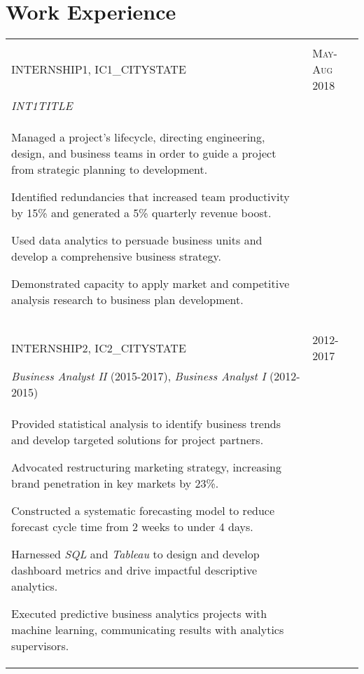 \documentclass[a4paper,10pt]{article}
\begin{document}
\section{Work Experience}
\begin{supertabular}{p{13.9cm}>{\raggedleft\arraybackslash}p{3.4cm}}

   \\

	\textsc{INTERNSHIP1}, IC1_CITYSTATE
	& \textsc{May-Aug 2018} \\
	\small	\emph{INT1TITLE} & \\
	\begin{enumerate*}[label =$\circ$, itemjoin={\newline}]
		\item \footnotesize Managed a project's lifecycle, directing engineering, design, and business teams in order to guide a project from strategic planning to development.
		\item \footnotesize Identified redundancies that increased team productivity by 15\% and generated a 5\% quarterly revenue boost.
		\item \footnotesize Used data analytics to persuade business units and develop a comprehensive business strategy.
		\item \footnotesize Demonstrated capacity to apply market and competitive analysis research to business plan development.
	\end{enumerate*} & \\
	 \\
   \\

	\textsc{INTERNSHIP2}, IC2_CITYSTATE
	& \textsc{2012-2017} \\
	\small	\emph{Business Analyst II} (2015-2017), \emph{Business Analyst I} (2012-2015) & \\
	\begin{enumerate*}[label =$\circ$, itemjoin={\newline}]
		\item \footnotesize Provided statistical analysis to identify business trends and develop targeted solutions for project partners.
		\item \footnotesize	Advocated restructuring marketing strategy, increasing brand penetration in key markets by 23\%.
		\item \footnotesize Constructed a systematic forecasting model to reduce forecast cycle time from 2 weeks to under 4 days.
		\item \footnotesize Harnessed \emph{SQL} and \emph{Tableau} to design and develop dashboard metrics and drive impactful descriptive analytics.
		\item \footnotesize Executed predictive business analytics projects with machine learning, communicating results with analytics supervisors.


\end{enumerate*}
\end{supertabular}
\end{document}
